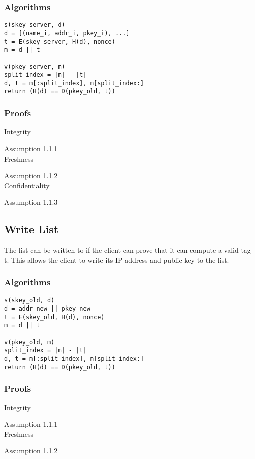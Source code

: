 \documentclass{article}
\begin{document}
\subsubsection{Algorithms}
\begin{verbatim}
s(skey_server, d)
d = [(name_i, addr_i, pkey_i), ...]
t = E(skey_server, H(d), nonce)
m = d || t

v(pkey_server, m)
split_index = |m| - |t|
d, t = m[:split_index], m[split_index:]
return (H(d) == D(pkey_old, t))
\end{verbatim}

\subsubsection{Proofs}
Integrity

Assumption 1.1.1 \\

Freshness

Assumption 1.1.2 \\

Confidentiality

Assumption 1.1.3 \\

\subsection{Write List}
The list can be written to if the client can prove that it can compute a valid tag t. This allows the client to write its IP address and public key to the list.

\subsubsection{Algorithms}
\begin{verbatim}
s(skey_old, d)
d = addr_new || pkey_new
t = E(skey_old, H(d), nonce)
m = d || t

v(pkey_old, m)
split_index = |m| - |t|
d, t = m[:split_index], m[split_index:]
return (H(d) == D(pkey_old, t))
\end{verbatim}

\subsubsection{Proofs}
Integrity

Assumption 1.1.1 \\

Freshness

Assumption 1.1.2 \\
\end{document}
